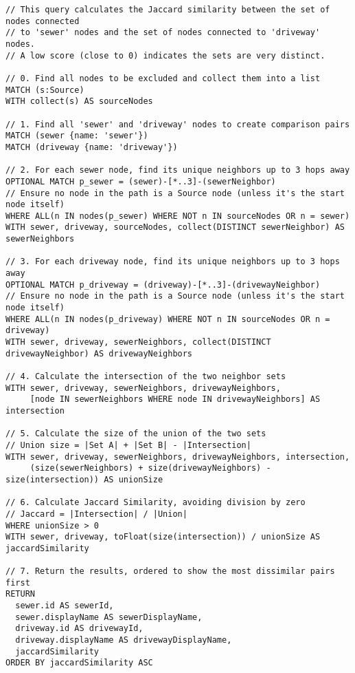 \begin{lstlisting}[style=cypher, caption={Jaccard similarity between 'sewer' and 'driveway' node neighborhoods.}, label={lst:jaccard}]
// This query calculates the Jaccard similarity between the set of nodes connected
// to 'sewer' nodes and the set of nodes connected to 'driveway' nodes.
// A low score (close to 0) indicates the sets are very distinct.

// 0. Find all nodes to be excluded and collect them into a list
MATCH (s:Source)
WITH collect(s) AS sourceNodes

// 1. Find all 'sewer' and 'driveway' nodes to create comparison pairs
MATCH (sewer {name: 'sewer'})
MATCH (driveway {name: 'driveway'})

// 2. For each sewer node, find its unique neighbors up to 3 hops away
OPTIONAL MATCH p_sewer = (sewer)-[*..3]-(sewerNeighbor)
// Ensure no node in the path is a Source node (unless it's the start node itself)
WHERE ALL(n IN nodes(p_sewer) WHERE NOT n IN sourceNodes OR n = sewer)
WITH sewer, driveway, sourceNodes, collect(DISTINCT sewerNeighbor) AS sewerNeighbors

// 3. For each driveway node, find its unique neighbors up to 3 hops away
OPTIONAL MATCH p_driveway = (driveway)-[*..3]-(drivewayNeighbor)
// Ensure no node in the path is a Source node (unless it's the start node itself)
WHERE ALL(n IN nodes(p_driveway) WHERE NOT n IN sourceNodes OR n = driveway)
WITH sewer, driveway, sewerNeighbors, collect(DISTINCT drivewayNeighbor) AS drivewayNeighbors

// 4. Calculate the intersection of the two neighbor sets
WITH sewer, driveway, sewerNeighbors, drivewayNeighbors,
     [node IN sewerNeighbors WHERE node IN drivewayNeighbors] AS intersection

// 5. Calculate the size of the union of the two sets
// Union size = |Set A| + |Set B| - |Intersection|
WITH sewer, driveway, sewerNeighbors, drivewayNeighbors, intersection,
     (size(sewerNeighbors) + size(drivewayNeighbors) - size(intersection)) AS unionSize

// 6. Calculate Jaccard Similarity, avoiding division by zero
// Jaccard = |Intersection| / |Union|
WHERE unionSize > 0
WITH sewer, driveway, toFloat(size(intersection)) / unionSize AS jaccardSimilarity

// 7. Return the results, ordered to show the most dissimilar pairs first
RETURN
  sewer.id AS sewerId,
  sewer.displayName AS sewerDisplayName,
  driveway.id AS drivewayId,
  driveway.displayName AS drivewayDisplayName,
  jaccardSimilarity
ORDER BY jaccardSimilarity ASC
\end{lstlisting}

